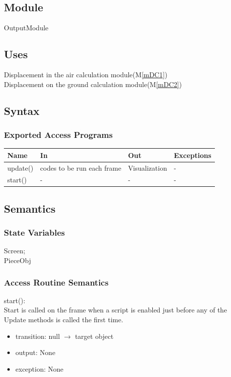 \documentclass[12pt, titlepage]{article}
\newcommand{\mref}[1]{M\ref{#1}}
\begin{document}
\subsection{Module}

OutputModule

\subsection{Uses}

Displacement in the air calculation module(\mref{mDC1})\\
Displacement on the ground calculation module(\mref{mDC2})\\

\subsection{Syntax}

\subsubsection{Exported Access Programs}

\begin{center}
	\begin{tabular}{p{2cm} p{4cm} p{4cm} p{2cm}}
		\hline
		\textbf{Name} & \textbf{In} & \textbf{Out} & \textbf{Exceptions} \\
		\hline
		update() & codes to be run each frame & Visualization & - \\
		start() & - & - & - \\
		\hline
	\end{tabular}
\end{center}

\subsection{Semantics}

\subsubsection{State Variables}

Screen;\\
PieceObj
\subsubsection{Access Routine Semantics}

\noindent start():\\
Start is called on the frame when a script is enabled just before any of the Update methods is called the first time.
\begin{itemize}
	\item transition: null $\rightarrow$ target object 
	\item output: None 
	\item exception: None  
\end{itemize}
\end{document}

